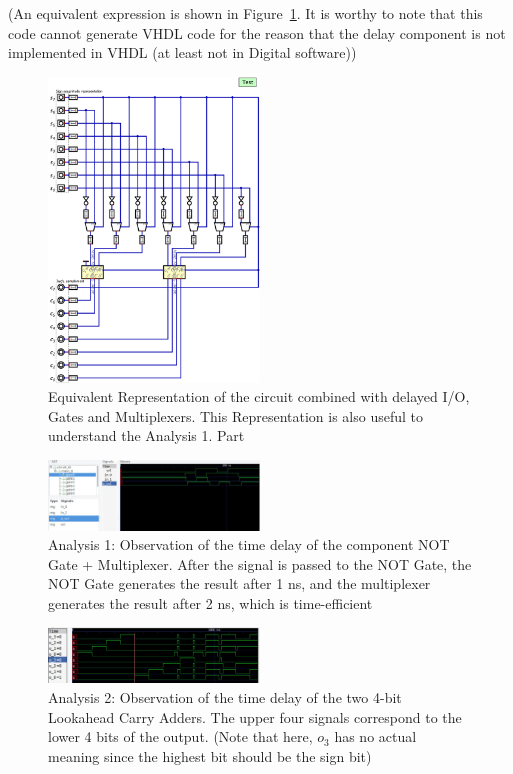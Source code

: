 \documentclass[conference]{IEEEtran}
\begin{document}
(An equivalent expression is shown in Figure~\ref{fig:delay}. It is worthy to note that this code cannot generate VHDL code for the reason that the delay component is not implemented in VHDL (at least not in Digital software))


\begin{figure}[h!]
    \centering
    \includegraphics[width=0.5\textwidth]{assets/twos_complement_dq_copy_delay.png}
    \caption{Equivalent Representation of the circuit combined with delayed I/O, Gates and Multiplexers. This Representation is also useful to understand the Analysis 1. Part}
    \label{fig:delay}
\end{figure}


\begin{figure}[h!]
    \centering
    \includegraphics[width=0.5\textwidth]{assets/gtkwave-1.png}
    \caption{Analysis 1: Observation of the time delay of the component {NOT Gate + Multiplexer}. After the signal is passed to the NOT Gate, the NOT Gate generates the result after 1 ns, and the multiplexer generates the result after 2 ns, which is time-efficient}
    \label{fig:analysis1}
\end{figure}

\begin{figure}[h!]
    \centering
    \includegraphics[width=0.5\textwidth]{assets/gtkwave-2.png}
    \caption{Analysis 2: Observation of the time delay of the two 4-bit Lookahead Carry Adders. The upper four signals correspond to the lower 4 bits of the output. (Note that here, $o_3$ has no actual meaning since the highest bit should be the sign bit)}
    \label{fig:analysis2}
\end{figure}
\end{document}
